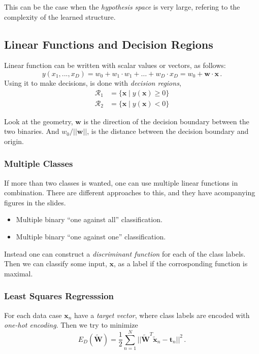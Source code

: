 This can be the case when the \emph{hypothesis space} is very large, refering to the complexity of the learned structure.

\subsection{Linear Functions and Decision Regions}

Linear function can be written with scalar values or vectors, as follows:
\[
    y(x_1, ..., x_D) = w_0 + w_1 \cdot w_1 + \dots + w_D \cdot x_D = w_0 + \mathbf{w} \cdot \mathbf{x}\,.
\]
Using it to make decisions, is done with \emph{decision regions},
\begin{align*}
    \mathcal{R}_1 &= \{\mathbf{x} \mid y(\mathbf{x}) \geq 0\} \\
    \mathcal{R}_2 &= \{\mathbf{x} \mid y(\mathbf{x}) < 0 \}
\end{align*}

Look at the geometry, $\mathbf{w}$ is the direction of the decision boundary between the two binaries.
And $w_0 / || \mathbf{w} ||$, is the distance between the decision boundary and origin.

\subsubsection{Multiple Classes}

If more than two classes is wanted, one can use multiple linear functions in combination.
There are different approaches to this, and they have acompanying figures in the slides.
\begin{itemize}
    \item Multiple binary ``one against all'' classification.
    \item Multiple binary ``one against one'' classification.
\end{itemize}

Instead one can construct a \emph{discriminant function} for each of the class labels.
Then we can classify some input, $\mathbf{x}$, as a label if the corrosponding function is maximal.

\subsubsection{Least Squares Regresssion}

For each data case $\mathbf{x}_n$ have a \emph{target vector}, where class labels are encoded with \emph{one-hot encoding}.
Then we try to minimize
\[
    E_D(\mathbf{\tilde{W}}) = \frac 1 2 \sum_{n=1}^N || \mathbf{\tilde{W}}^T \mathbf{\tilde{x}}_n - \mathbf{t}_n ||^2\,.
\]

